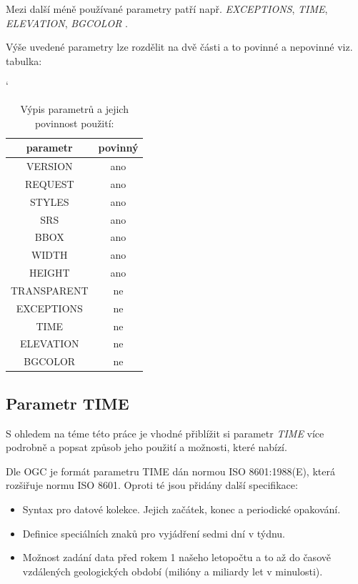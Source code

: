 Mezi další méně používané parametry patří např. \textit{EXCEPTIONS}, \textit{TIME}, \textit{ELEVATION}, \textit{BGCOLOR} \cite{oqc_wms}.

Výše uvedené parametry lze rozdělit na dvě části a to povinné a nepovinné viz. tabulka:

\bigskip
\begin{table}[h!]
	\catcode`
	\centering
	\begin{tabular}{|c|c|}
		\hline
		parametr & povinný \\ \hline
		\hline
		VERSION & ano \\ \hline
		REQUEST & ano \\ \hline
		STYLES & ano \\ \hline
		SRS & ano \\ \hline
		BBOX & ano \\ \hline
		WIDTH & ano \\ \hline
		HEIGHT & ano \\ \hline
		TRANSPARENT & ne \\ \hline
		EXCEPTIONS & ne \\ \hline
		TIME & ne \\ \hline
		ELEVATION & ne \\ \hline
		BGCOLOR & ne \\ \hline
\end{tabular}
	\caption{Výpis parametrů a jejich povinnost použití: \cite{oqc_wms}}
	\label{tab:WPS_ExecuteRequest}
\end{table}

\subsection{Parametr TIME}
S ohledem na téme této práce je vhodné přiblížit si parametr \textit{TIME} více podrobně a popsat způsob jeho použití a možnosti, které nabízí.

Dle OGC je formát parametru TIME dán normou ISO 8601:1988(E), která rozšiřuje normu ISO 8601. Oproti té jsou přidány další specifikace\cite{oqc_wms}:
\begin{itemize}
	\item Syntax pro datové kolekce. Jejich začátek, konec a periodické opakování.
	\item Definice speciálních znaků pro vyjádření sedmi dní v týdnu.  
	\item Možnost zadání data před rokem 1 našeho letopočtu a to až do časově vzdálených geologických období (milióny a miliardy let v minulosti).
\end{itemize}

